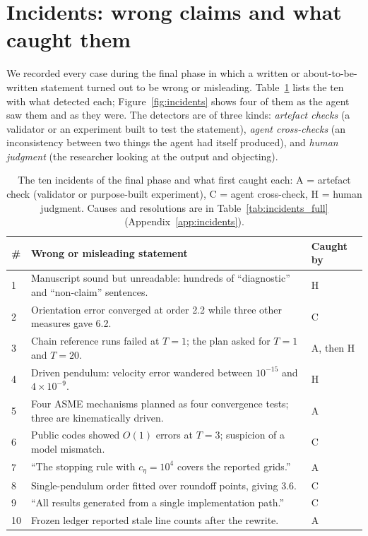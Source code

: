 \section{Incidents: wrong claims and what caught them}
\label{sec:incidents}

We recorded every case during the final phase in which a written or about-to-be-written statement
turned out to be wrong or misleading. Table~\ref{tab:incidents} lists the ten with what detected
each; Figure~\ref{fig:incidents} shows four of them as the agent saw them and as they were. The
detectors are of three kinds: \emph{artefact checks} (a validator or an experiment built to test
the statement), \emph{agent cross-checks} (an inconsistency between two things the agent had itself
produced), and \emph{human judgment} (the researcher looking at the output and objecting).

\begin{table}[t]
\centering
\scriptsize
\begin{tabularx}{\columnwidth}{@{}P{0.03\columnwidth}YP{0.14\columnwidth}@{}}
\toprule
\# & Wrong or misleading statement & Caught by \\
 & Manuscript sound but unreadable: hundreds of ``diagnostic'' and ``non-claim'' sentences. & H \\
2 & Orientation error converged at order 2.2 while three other measures gave 6.2. & C \\
3 & Chain reference runs failed at $T=1$; the plan asked for $T=1$ and $T=20$. & A, then H \\
4 & Driven pendulum: velocity error wandered between $10^{-15}$ and $4\times10^{-9}$. & H \\
5 & Four ASME mechanisms planned as four convergence tests; three are kinematically driven. & A \\
6 & Public codes showed $O(1)$ errors at $T=3$; suspicion of a model mismatch. & C \\
7 & ``The stopping rule with $c_\eta=10^4$ covers the reported grids.'' & A \\
8 & Single-pendulum order fitted over roundoff points, giving 3.6. & C \\
9 & ``All results generated from a single implementation path.'' & C \\
10 & Frozen ledger reported stale line counts after the rewrite. & A \\
\bottomrule
\end{tabularx}
\caption{The ten incidents of the final phase and what first caught each: A = artefact check
(validator or purpose-built experiment), C = agent cross-check, H = human judgment. Causes and
resolutions are in Table~\ref{tab:incidents_full} (Appendix~\ref{app:incidents}).}
\label{tab:incidents}
\end{table}


